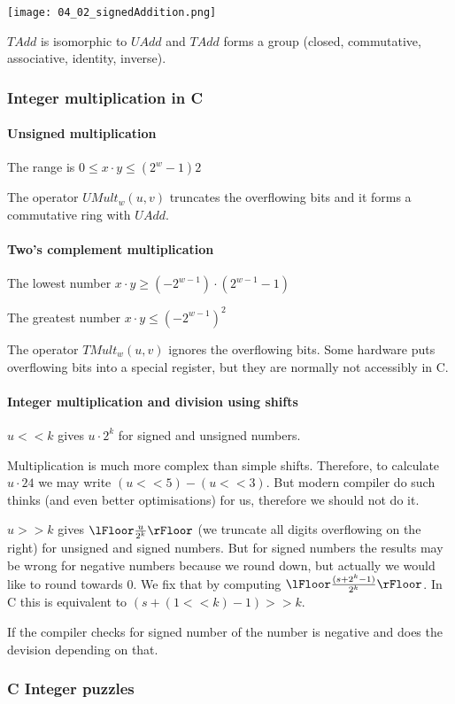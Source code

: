 \texttt{[image: 04\_02\_signedAddition.png]}
 
$TAdd$ is isomorphic to $UAdd$ and $TAdd$ forms a group (closed, commutative, associative, identity, inverse).

\subsubsection{Integer multiplication in C}

\paragraph{Unsigned multiplication}
The range is $0 \le x \cdot y \le (2^w -1)2$

The operator $UMult_w(u,v)$ truncates the overflowing bits and it forms a commutative ring with $UAdd$.

\paragraph{Two's complement multiplication}
The lowest number $x \cdot y \ge (-2^{w - 1}) \cdot (2^{w - 1} - 1)$

The greatest number $x \cdot y \le (-2^{w -1})^2$

The operator $TMult_w(u,v)$ ignores the overflowing bits. Some hardware puts overflowing bits into a special register, but they are normally not accessibly in C.


\paragraph{Integer multiplication and division using shifts}
$u << k$ gives $u \cdot 2^k$ for signed and unsigned numbers.

Multiplication is much more complex than simple shifts. Therefore, to calculate $u \cdot 24$ we may write $(u << 5) - (u << 3)$. But modern compiler do such thinks (and even better optimisations) for us, therefore we should not do it.

$u >> k$ gives $\lFloor \frac{u}{2^k} \rFloor$ (we truncate all digits overflowing on the right) for unsigned and signed numbers. But for signed numbers the results may be wrong for negative numbers because we round down, but actually we would like to round towards $0$. We fix that by computing $\lFloor \frac{(s + 2^k - 1)}{2^k} \rFloor$. In C this is equivalent to $(s + (1 << k) -1) >> k$.

If the compiler checks for signed number of the number is negative and does the devision depending on that.

\subsubsection{C Integer puzzles}


